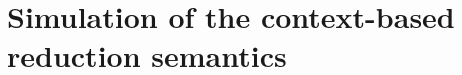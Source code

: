 \documentclass[12pt,phd,lfcs,twoside,openright,logo,leftchapter,normalheadings]{infthesis}
\theoremstyle{plain}
\theoremstyle{definition}
\begin{document}



\section{Simulation of the context-based reduction semantics}
\label{subsec:machine-correctness}
\end{document}
